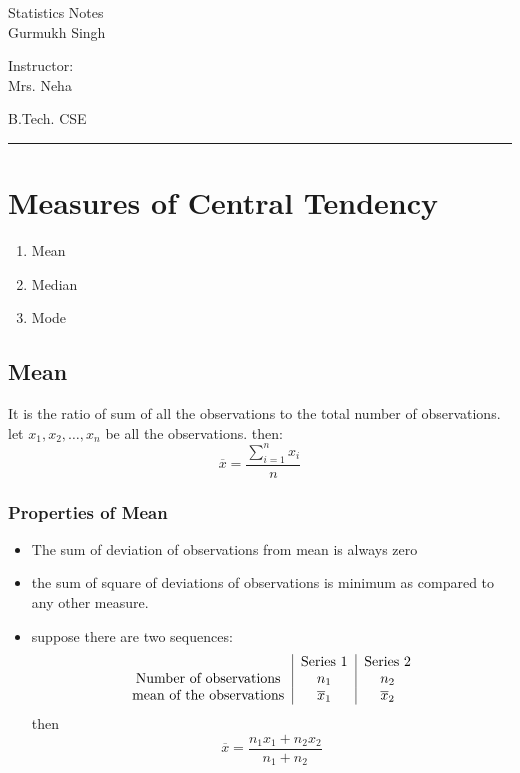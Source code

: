 \documentclass[11pt,letterpaper]{article}
\begin{document}
\begin{center}
  \Huge{Statistics Notes}\\
  \vspace{0.25cm}
  \small{Gurmukh Singh}
\end{center}

\vspace{-1.75cm}

\begin{flushright}
  Instructor: \\ Mrs. Neha
\end{flushright}

\vspace{-1.3cm}

\begin{flushleft}
  B.Tech. CSE
\end{flushleft}

\rule{15.5cm}{0.1mm}%

\tableofcontents
\pagebreak


\section{Measures of Central Tendency}
\begin{enumerate}
  \item Mean
  \item Median
  \item Mode
\end{enumerate}

\subsection{Mean}
It is the ratio of sum of all the observations to the total number of observations.
let $x_1, x_2, \dots, x_n$ be all the observations. then:
\[
  \overline{x} =\frac{\sum_{i=1}^n x_i}{n}
\]

\subsubsection{Properties of Mean}
\begin{itemize}
  \item The sum of deviation of observations from mean is always zero
  \item the sum of square of deviations of observations is minimum as compared to any other measure.
  \item suppose there are two sequences:
    \[
      \begin{tabular}{c|c|c}
        & Series 1 & Series 2 \\ 
        Number of observations & $n_1$ & $n_2$ \\ 
        mean of the observations & $\overline{x}_1 $& $\overline{x}_2$
      \end{tabular} 
    \]
    then
    \[
      \overline{x} = \frac{n_1x_1+n_2x_2}{n_1+n_2}
    \]
\end{itemize}
\end{document}
